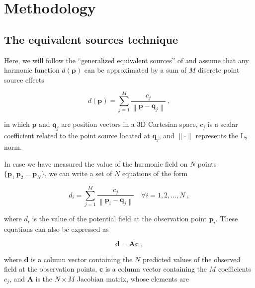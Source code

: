 \documentclass[twocolumn]{article}
\begin{document}

\section{Methodology}

\subsection{The equivalent sources technique}

Here, we will follow the ``generalized equivalent sources'' of
\citet{cordell1992} and assume that any harmonic function $d(\mathbf{p})$ can
be approximated by a sum of $M$ discrete point source effects

\begin{equation}
    d(\mathbf{p})
    =
    \sum\limits_{j=1}^{M} \frac{c_j}{\left\lVert \mathbf{p} - \mathbf{q}_j
    \right\rVert} \ ,
    \label{eq:eql-forward}
\end{equation}

\noindent in which
$\mathbf{p}$ and $\mathbf{q}_j$ are position vectors in a 3D Cartesian space,
$c_j$ is a scalar coefficient related to the point source located at
$\mathbf{q}_j$,
and $\lVert \cdot \rVert$ represents the $\text{L}_2$ norm.

In case we have measured the value of the harmonic field on $N$ points
$\{\mathbf{p}_1\ \mathbf{p}_2\ \ldots\ \mathbf{p}_N\}$,
we can write a set of $N$ equations of the form

\begin{equation}
    d_i
    =
    \sum\limits_{j=1}^{M} \frac{c_j}{\left\lVert \mathbf{p}_i - \mathbf{q}_j
    \right\rVert}
    \quad \forall i=1,2,\ldots,N
    \ ,
    \label{eq:forward-sum}
\end{equation}

\noindent where $d_i$ is the value of the potential field at the observation point $\mathbf{p}_i$.
These equations can also be expressed as

\begin{equation}
    \mathbf{d} = \mathbf{A} \mathbf{c} \ ,
    \label{eq:linear-problem}
\end{equation}

\noindent where $\mathbf{d}$ is a column vector containing the $N$ predicted
values of the observed field at the observation points,
$\mathbf{c}$ is a column vector containing the $M$ coefficients $c_j$,
and $\mathbf{A}$ is the $N \times M$ Jacobian matrix,
whose elements are
\end{document}
